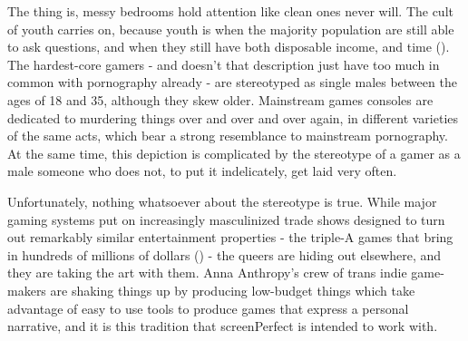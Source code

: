 The thing is, messy bedrooms hold attention like clean ones never will. The cult of youth carries on, because youth is when the majority population are still able to ask questions, and when they still have both disposable income, and time (\cite{economyterrible}). The hardest-core gamers - and doesn't that description just have too much in common with pornography already - are stereotyped as single males between the ages of 18 and 35, although they skew older. Mainstream games consoles are dedicated to murdering things over and over and over again, in different varieties of the same acts, which bear a strong resemblance to mainstream pornography. At the same time, this depiction is complicated by the stereotype of a gamer as a male someone who does not, to put it indelicately, get laid very often.

Unfortunately, nothing whatsoever about the stereotype is true. While major gaming systems put on increasingly masculinized trade shows designed to turn out remarkably similar entertainment properties - the triple-A games that bring in hundreds of millions of dollars (\cite{valueofaaa}) - the queers are hiding out elsewhere, and they are taking the art with them. Anna Anthropy's crew of trans indie game-makers are shaking things up by producing low-budget things which take advantage of easy to use tools to produce games that express a personal narrative, and it is this tradition that screenPerfect is intended to work with.